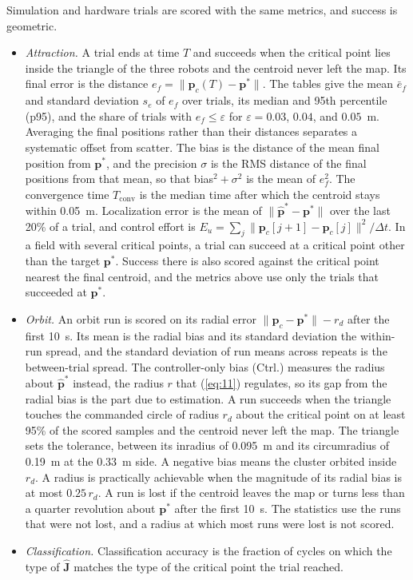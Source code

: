 \documentclass[lettersize,journal]{IEEEtran}
\begin{document}
Simulation and hardware trials are scored with the same metrics, and success is geometric.
\begin{itemize}\setlength{\itemsep}{0pt}\setlength{\topsep}{2pt}\setlength{\parsep}{0pt}
\item \emph{Attraction.} A trial ends at time $T$ and succeeds when the critical point lies inside the triangle of the three robots and the centroid never left the map. Its final error is the distance $e_f = \|\mathbf{p}_c(T) - \mathbf{p}^*\|$. The tables give the mean $\bar{e}_f$ and standard deviation $s_e$ of $e_f$ over trials, its median and 95th percentile (p95), and the share of trials with $e_f \le \varepsilon$ for $\varepsilon = 0.03$, $0.04$, and $0.05$~m. Averaging the final positions rather than their distances separates a systematic offset from scatter. The bias is the distance of the mean final position from $\mathbf{p}^*$, and the precision $\sigma$ is the RMS distance of the final positions from that mean, so that bias$^2 + \sigma^2$ is the mean of $e_f^2$. The convergence time $T_{\mathrm{conv}}$ is the median time after which the centroid stays within 0.05~m. Localization error is the mean of $\|\hat{\mathbf{p}}^* - \mathbf{p}^*\|$ over the last 20\% of a trial, and control effort is $E_u = \sum_j \|\mathbf{p}_c[j+1] - \mathbf{p}_c[j]\|^2/\Delta t$. In a field with several critical points, a trial can succeed at a critical point other than the target $\mathbf{p}^*$. Success there is also scored against the critical point nearest the final centroid, and the metrics above use only the trials that succeeded at $\mathbf{p}^*$.
\item \emph{Orbit.} An orbit run is scored on its radial error $\|\mathbf{p}_c - \mathbf{p}^*\| - r_d$ after the first 10~s. Its mean is the radial bias and its standard deviation the within-run spread, and the standard deviation of run means across repeats is the between-trial spread. The controller-only bias (Ctrl.) measures the radius about $\hat{\mathbf{p}}^*$ instead, the radius $r$ that (\ref{eq:11}) regulates, so its gap from the radial bias is the part due to estimation. A run succeeds when the triangle touches the commanded circle of radius $r_d$ about the critical point on at least 95\% of the scored samples and the centroid never left the map. The triangle sets the tolerance, between its inradius of 0.095~m and its circumradius of 0.19~m at the 0.33~m side. A negative bias means the cluster orbited inside $r_d$. A radius is practically achievable when the magnitude of its radial bias is at most $0.25\,r_d$. A run is lost if the centroid leaves the map or turns less than a quarter revolution about $\mathbf{p}^*$ after the first 10~s. The statistics use the runs that were not lost, and a radius at which most runs were lost is not scored.
\item \emph{Classification.} Classification accuracy is the fraction of cycles on which the type of $\hat{\mathbf{J}}$ matches the type of the critical point the trial reached.
\end{itemize}
\end{document}

